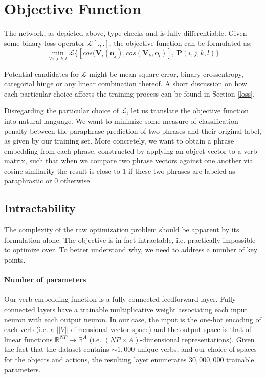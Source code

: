 \documentclass[a4paper,11pt]{article}
\newcommand{\abs}[1]{\lvert\lvert #1\rvert\rvert}
\begin{document}
\section{Objective Function}
\label{sec:obj}
The network, as depicted above, type checks and is fully differentiable. Given some binary loss operator $\mathcal{L}[.,.]$, the objective function can be formulated as:
\[
\min_{\forall i,j,k,l} \mathcal{L}\{[cos(\mathbf{V}_i(\mathbf{o}_j), cos(\mathbf{V}_k,\mathbf{o}_l)], \ \mathbf{P}(i,j,k,l)\}
\]

Potential candidates for $\mathcal{L}$ might be mean square error, binary crossentropy, categorial hinge or any linear combination thereof. A short discussion on how each particular choice affects the training process can be found in Section \ref{loss}.

Disregarding the particular choice of $\mathcal{L}$, let us translate the objective function into natural language. We want to minimize some measure of classification penalty between the paraphrase prediction of two phrases and their original label, as given by our training set. More concretely, we want to obtain a phrase embedding from each phrase, constructed by applying an object vector to a verb matrix, such that when we compare two phrase vectors against one another via cosine similarity the result is close to $1$ if these two phrases are labeled as paraphrastic or $0$ otherwise.

\subsection{Intractability}
The complexity of the raw optimization problem should be apparent by its formulation alone. The objective is in fact intractable, i.e. practically impossible to optimize over. To better understand why, we need to address a number of key points.

\paragraph{Number of parameters}
Our verb embedding function is a fully-connected feedforward layer. Fully connected layers have a trainable multiplicative weight associating each input neuron with each output neuron. In our case, the input is the one-hot encoding of each verb (i.e. a $\abs{V}$-dimensional vector space) and the output space is that of linear functions $\mathbb{R}^{NP} \to \mathbb{R}^{A}$ (i.e. $(NP \times A)$-dimensional representations). Given the fact that the dataset contains $\sim 1,000$ unique verbs, and our choice of spaces for the objects 
and actions, the resulting layer enumerates $30,000,000$ trainable parameters.
\end{document}
